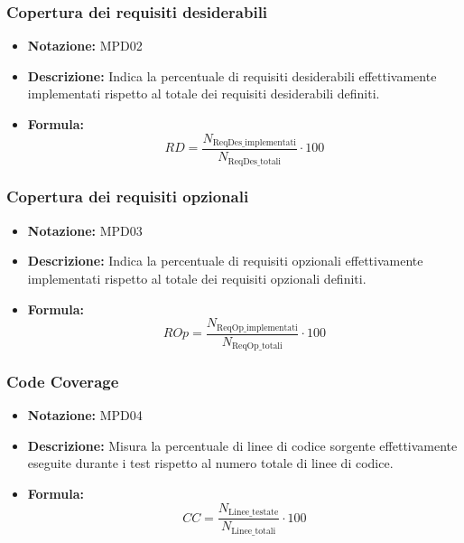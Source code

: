 \documentclass[a4paper,12pt]{article}
\begin{document}
        \subsubsection{Copertura dei requisiti desiderabili}
            \begin{itemize}
                \item \textbf{Notazione:} MPD02
                \item \textbf{Descrizione:} Indica la percentuale di requisiti desiderabili effettivamente implementati rispetto al totale dei requisiti desiderabili definiti.
                \item \textbf{Formula:} 
                \[ RD = \frac{N_\text{ReqDes\_implementati}}{N_\text{ReqDes\_totali}} \cdot 100 \]
            \end{itemize}

        \subsubsection{Copertura dei requisiti opzionali}
            \begin{itemize}
                \item \textbf{Notazione:} MPD03
                \item \textbf{Descrizione:} Indica la percentuale di requisiti opzionali effettivamente implementati rispetto al totale dei requisiti opzionali definiti.
                \item \textbf{Formula:} 
                \[ ROp = \frac{N_\text{ReqOp\_implementati}}{N_\text{ReqOp\_totali}} \cdot 100 \]
            \end{itemize}

        \subsubsection{Code Coverage}
            \begin{itemize}
                \item \textbf{Notazione:} MPD04
                \item \textbf{Descrizione:} Misura la percentuale di linee di codice sorgente effettivamente eseguite durante i test rispetto al numero totale di linee di codice.
                \item \textbf{Formula:} 
                \[ CC = \frac{N_\text{Linee\_testate}}{N_\text{Linee\_totali}} \cdot 100 \]
            \end{itemize}
\end{document}
